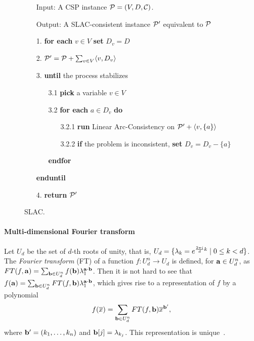 \documentclass[11pt,letter]{article}
\begin{document}
\begin{figure}
\begin{itemize}\setlength\itemsep{-3pt}
\item[Input:]
A CSP instance ${\mathcal P}=(V,D,{\mathcal C})$.
\item[Output:]
A SLAC-consistent instance ${\mathcal P}'$ equivalent to ${\mathcal P}$
\item[1.]
{\bf for each} $v\in V$ {\bf set} $D_v=D$
\item[2.]
${\mathcal P}'={\mathcal P}+\sum_{v\in V}\langle v,D_v \rangle$
\item[3.]
{\bf until} the process stabilizes
\begin{itemize}
\item[3.1]
{\bf pick} a variable $v\in V$
\item[3.2]
{\bf for each} $a\in D_v$ {\bf do}
\begin{itemize}
\item[3.2.1]
{\bf run} Linear Arc-Consistency on ${\mathcal P}'+\langle v,\{a\} \rangle$
\item[3.2.2]
{\bf if} the problem is inconsistent, {\bf set} $D_v=D_v-\{a\}$
\end{itemize}
\item[]
{\bf endfor}
\end{itemize}
\item[]
{\bf enduntil}
\item[4.]
{\bf return} ${\mathcal P}'$
\end{itemize}
\vspace*{-1.2cm}
\caption{SLAC.}\label{fig:slac}
\end{figure}



\paragraph{Multi-dimensional Fourier transform}\label{sec:multi-FT}

Let $U_d$ be the set of $d$-th roots of unity, that is,
$U_d=\{\lambda_k=e^{\frac{2\pi i}d k}\mid 0\le k<d\}$.
The \emph{Fourier transform} (FT) of a function $f:U_d^n\to U_d$ is defined, for 
${\bf a}\in U_d^n$, as
$
FT(f,{\bf a})=\sum_{{\bf b}\in U_d^n}f({\bf b})\lambda_1^{{\bf a}\cdot{\bf b}}$.
Then it is not hard to see that 
$
f({\bf a})=\sum_{{\bf b}\in U_d^n}FT(f,{\bf b})\lambda_1^{{\bf a}\cdot{\bf b}}$,
which gives rise to a representation of $f$ by a polynomial
\[
f(\overline x)=\sum_{{\bf b}\in U_d^n}FT(f,{\bf b})\overline x^{{\bf b}'},
\]
where ${\bf b}'=(k _1,\ldots, k _{n})$ and ${\bf b}[j]=\lambda_{k_j}$. This representation is
unique~\cite{ODonnell14:book}.
\end{document}

